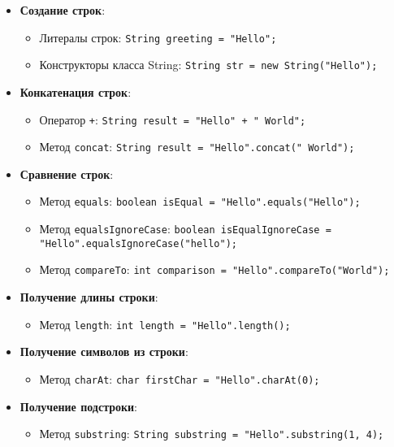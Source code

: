 \documentclass[12pt, a4paper]{article}
\begin{document}
\begin{itemize}
    \item \textbf{Создание строк}:
    \begin{itemize}
        \item Литералы строк: \texttt{String greeting = "Hello";}
        \item Конструкторы класса String: \texttt{String str = new String("Hello");}
    \end{itemize}

    \item \textbf{Конкатенация строк}:
    \begin{itemize}
        \item Оператор \texttt{+}: \texttt{String result = "Hello" + " World";}
        \item Метод \texttt{concat}: \texttt{String result = "Hello".concat(" World");}
    \end{itemize}

    \item \textbf{Сравнение строк}:
    \begin{itemize}
        \item Метод \texttt{equals}: \texttt{boolean isEqual = "Hello".equals("Hello");}
        \item Метод \texttt{equalsIgnoreCase}: \texttt{boolean isEqualIgnoreCase = "Hello".equalsIgnoreCase("hello");}
        \item Метод \texttt{compareTo}: \texttt{int comparison = "Hello".compareTo("World");}
    \end{itemize}

    \item \textbf{Получение длины строки}:
    \begin{itemize}
        \item Метод \texttt{length}: \texttt{int length = "Hello".length();}
    \end{itemize}

    \item \textbf{Получение символов из строки}:
    \begin{itemize}
        \item Метод \texttt{charAt}: \texttt{char firstChar = "Hello".charAt(0);}
    \end{itemize}

    \item \textbf{Получение подстроки}:
    \begin{itemize}
        \item Метод \texttt{substring}: \texttt{String substring = "Hello".substring(1, 4);}
    \end{itemize}


\end{itemize}
\end{document}
